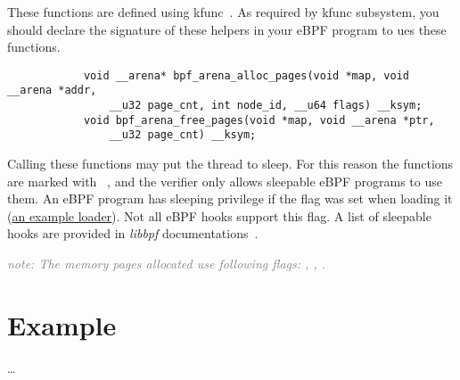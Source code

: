 \documentclass{article}
\begin{document}
These functions are defined using kfunc~\cite{eunomia_kfunc, ebpf_docs_kfunc}.
As required by kfunc subsystem, you should declare the signature of these
helpers in your eBPF program to ues these functions.
\begin{minipage}{\linewidth}
    \begin{flushleft}
            \begin{lstlisting}
            void __arena* bpf_arena_alloc_pages(void *map, void __arena *addr,
                __u32 page_cnt, int node_id, __u64 flags) __ksym;
            void bpf_arena_free_pages(void *map, void __arena *ptr,
                __u32 page_cnt) __ksym;
            \end{lstlisting}
        \end{flushleft}
\end{minipage}

Calling these functions may put the thread to sleep. For this reason the
functions are marked with ~\cite{arena_source}, and the
verifier only allows sleepable eBPF programs to use them. An eBPF program has
sleeping privilege if the  flag was set when loading it
(\href{https://github.com/bpf-endeavor/ebpf-arena-tutorial/blob/9b399ae7784ade572aa213f0ac37fd2d84b7c13a/src/mogu_loader.c\#L91}{an example loader}).
Not all eBPF hooks support this flag. A list of sleepable
hooks are provided in \emph{libbpf} documentations~\cite{libbpf_sleepable}.

\textcolor{gray}{\emph{note: The memory pages allocated use following flags: , , .}}


\section{Example}
\dots{}

% 



\end{document}
